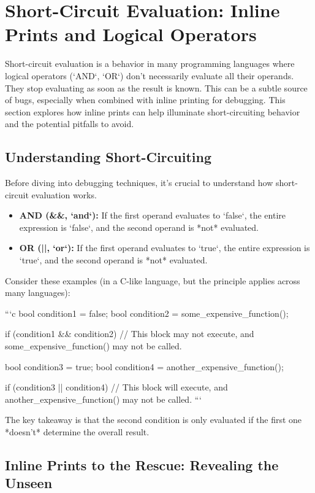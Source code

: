 \documentclass{article}
\begin{document}
{{{{\section*{Short-Circuit Evaluation: Inline Prints and Logical Operators}

Short-circuit evaluation is a behavior in many programming languages where logical operators (`AND`, `OR`) don't necessarily evaluate all their operands. They stop evaluating as soon as the result is known. This can be a subtle source of bugs, especially when combined with inline printing for debugging. This section explores how inline prints can help illuminate short-circuiting behavior and the potential pitfalls to avoid.

\subsection*{Understanding Short-Circuiting}

Before diving into debugging techniques, it's crucial to understand how short-circuit evaluation works.

\begin{itemize}
    \item \textbf{AND (&&, `and`):}  If the first operand evaluates to `false`, the entire expression is `false`, and the second operand is *not* evaluated.
    \item \textbf{OR (||, `or`):} If the first operand evaluates to `true`, the entire expression is `true`, and the second operand is *not* evaluated.
\end{itemize}

Consider these examples (in a C-like language, but the principle applies across many languages):

```c
bool condition1 = false;
bool condition2 = some_expensive_function();

if (condition1 && condition2) {
  // This block may not execute, and some_expensive_function() may not be called.
}

bool condition3 = true;
bool condition4 = another_expensive_function();

if (condition3 || condition4) {
  // This block will execute, and another_expensive_function() may not be called.
}
```

The key takeaway is that the second condition is only evaluated if the first one *doesn't* determine the overall result.

\subsection*{Inline Prints to the Rescue: Revealing the Unseen}

}}}}
\end{document}
